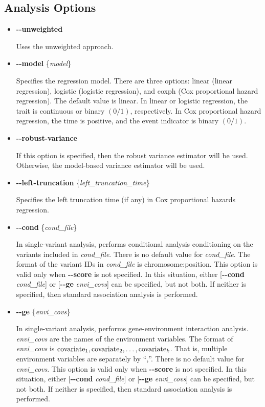 \documentclass[12pt,letter]{article}
\begin{document}
\subsection{Analysis Options}
\begin{itemize}
\item {\bf -{}-unweighted}

Uses the unweighted approach.

\item {\bf -{}-model} \{{\it model}\}

Specifies the regression model. There are three options: {\ttfamily linear} (linear regression),  
{\ttfamily logistic} (logistic regression), and {\ttfamily coxph} (Cox proportional
hazard regression). The default value 
is {\ttfamily linear}. In linear or logistic regression, the trait is continuous or binary $(0/1)$,
respectively. In Cox proportional hazard regression, the time is positive, and the event indicator
is binary $(0/1)$.

\item {\bf -{}-robust-variance}

If this option is specified, then the robust variance estimator will be used. Otherwise, 
the model-based variance estimator will be used.

\item {\bf -{}-left-truncation} \{{\it left\_truncation\_time}\}

Specifies the left truncation time (if any) in Cox proportional hazards regression. 

\item {\bf -{}-cond} \{{\it cond\_file}\}

In single-variant analysis, performs conditional analysis conditioning on the variants included in {\it cond\_file}.
There is no default value for {\it cond\_file}. The format of the variant IDs in {\it cond\_file}
is {\ttfamily chromosome:position}.
This option is valid only when {\bf -{}-score}
is not specified. In this situation, either [{\bf -{}-cond} {\it cond\_file}]  
or [{\bf -{}-ge} {\it envi\_covs}] can be specified, but not both. If neither is specified, then
standard association analysis is performed.

\item {\bf -{}-ge} \{{\it envi\_covs}\}

In single-variant analysis, performs gene-environment interaction analysis. {\it envi\_covs} are the names of the 
environment variables. The format of {\it envi\_covs} is {\ttfamily $\text{covariate}_1,\\ \text{covariate}_2,\dotsc,\text{covariate}_k$}.
That is, multiple environment variables are separately by ``{\ttfamily ,}''.
There is no default value for {\it envi\_covs}.
This option is valid only when {\bf -{}-score}
is not specified. In this situation, either [{\bf -{}-cond} {\it cond\_file}]  
or [{\bf -{}-ge} {\it envi\_covs}] can be specified, but not both. If neither is specified, then
standard association analysis is performed.


\end{itemize}
\end{document}
